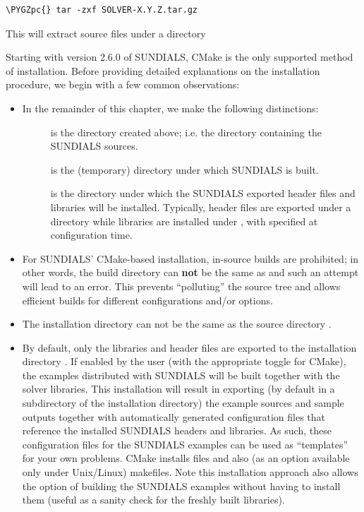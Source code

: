 \documentclass[letterpaper,10pt,english]{sphinxmanual}
\def\PYGZpc{\char`\%}
\begin{document}
\begin{Verbatim}[commandchars=\\\{\}]
\PYGZpc{} tar -zxf SOLVER-X.Y.Z.tar.gz
\end{Verbatim}

This will extract source files under a directory 

Starting with version 2.6.0 of SUNDIALS, CMake is the only supported
method of installation.  Before providing detailed explanations on the
installation procedure, we begin with a few common observations:
\begin{itemize}
\item {} 
In the remainder of this chapter, we make the following
distinctions:
\begin{description}
\item[{}] \leavevmode
is the directory  created above; i.e. the
directory containing the SUNDIALS sources.

\item[{}] \leavevmode
is the (temporary) directory under which SUNDIALS is built.

\item[{}] \leavevmode
is the directory under which the SUNDIALS exported
header files and libraries will be installed. Typically, header
files are exported under a directory  while
libraries are installed under , with 
specified at configuration time.

\end{description}

\item {} 
For SUNDIALS' CMake-based installation, in-source builds are prohibited;
in other words, the build directory  can \textbf{not} be the
same as  and such an attempt will lead to an error.  This
prevents ``polluting'' the source tree and allows efficient builds for
different configurations and/or options.

\item {} 
The installation directory  can not be the same as
the source directory .

\item {} 
By default, only the libraries and header files are exported to the
installation directory .  If enabled by the user (with the
appropriate toggle for CMake), the
examples distributed with SUNDIALS will be built together with the
solver libraries.  This installation will result in exporting (by
default in a subdirectory of the installation directory) the example
sources and sample outputs together with automatically generated
configuration files that reference the installed SUNDIALS headers
and libraries.  As such, these configuration files for the
SUNDIALS examples can be used as ``templates'' for your own
problems. CMake installs  files and also (as an
option available only under Unix/Linux) makefiles.  Note this
installation approach also allows the option of building the
SUNDIALS examples without having to install them (useful as a sanity
check for the freshly built libraries).


\end{itemize}
\end{document}
